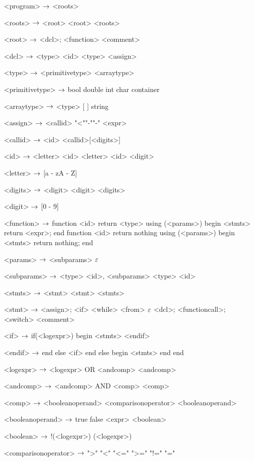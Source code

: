 \begin{grammar}
<program> $\rightarrow$ <roots>

<roots> $\rightarrow$ <root>
\alt <root> <roots>

<root> $\rightarrow$ <dcl>;
\alt <function>
\alt <comment>

<dcl> $\rightarrow$ <type> <id>
\alt <type> <assign>

<type> $\rightarrow$ <primitivetype>
\alt <arraytype>

<primitivetype> $\rightarrow$ bool
\alt double
\alt int
\alt char
\alt container

<arraytype> $\rightarrow$ <type> [ ]
\alt string

<assign>  $\rightarrow$ <callid> "<""-""-" <expr>

<callid> $\rightarrow$ <id>
\alt <callid>[<digits>]

<id> $\rightarrow$ <letter>
	\alt<id> <letter>
	\alt<id> <digit>

<letter> $\rightarrow$ [a - zA - Z]

<digits> $\rightarrow$ <digit>
\alt <digit> <digits>

<digit> $\rightarrow$ [0 - 9]

<function> $\rightarrow$  function <id> return <type> using (<params>)
begin
	<stmts>
	return <expr>;
end
\alt function <id> return nothing using (<params>)
begin
	<stmts>
	return nothing;
end

<params> $\rightarrow$ <subparams>
	\alt $\varepsilon$

<subparams> $\rightarrow$ <type> <id>, <subparams>
\alt <type> <id>

<stmts> $\rightarrow$ <stmt>
	\alt <stmt> <stmts>

<stmt> $\rightarrow$ <assign>;
	\alt <if>
	\alt <while>
	\alt <from>
	\alt $\varepsilon$
	\alt <dcl>;
	\alt <functioncall>;
	\alt <switch>
	\alt <comment>
	
<if> $\rightarrow$ if(<logexpr>)
	begin
		<stmts>
	<endif>

<endif> $\rightarrow$ end
	else <if>
	\alt end
	else
	begin
		<stmts>
	end
	\alt end
	 
<logexpr> $\rightarrow$ <logexpr> OR <andcomp>
		\alt <andcomp>

<andcomp> $\rightarrow$ <andcomp> AND <comp>

<comp> $\rightarrow$ <booleanoperand> <comparisonoperator> <booleanoperand>

<booleanoperand> $\rightarrow$ true
		\alt false
		\alt <boolean>

<boolean> $\rightarrow$ !(<logexpr>)
		\alt (<logexpr>)

<comparisonoperator> $\rightarrow$ ">"
				\alt "<"
				\alt "<="
				\alt ">="
				\alt "!="
				\alt "="


\end{grammar}
